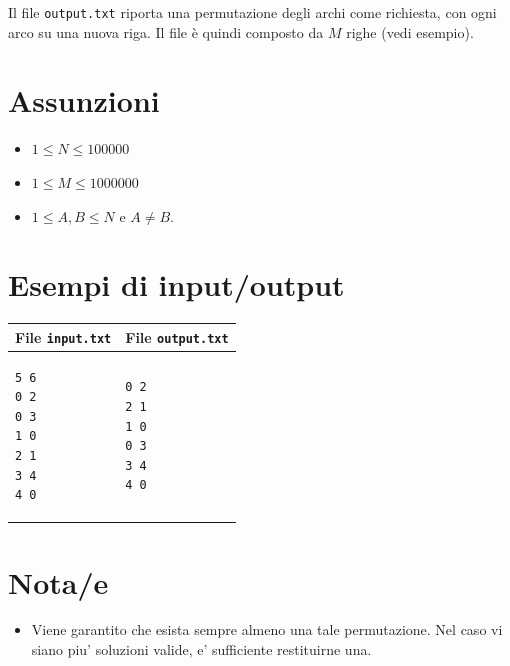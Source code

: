 \documentclass[a4paper,11pt]{article}
\begin{document}
Il file \texttt{output.txt}
riporta una permutazione degli archi come richiesta,
con ogni arco su una nuova riga.
Il file è quindi composto da $M$ righe (vedi esempio).

  \section*{Assunzioni}
  \begin{itemize}
  
    \item $1 ≤ N ≤ 100000$
    \item $1 ≤ M ≤ 1000000$
    \item $1 ≤ A, B ≤ N$ e $A ≠ B$.
  \end{itemize}

\section*{Esempi di input/output}

  
    \noindent
    \begin{tabular}{p{11cm}|p{5cm}}
    \toprule
    \textbf{File \texttt{input.txt}}
    & \textbf{File \texttt{output.txt}}
    \\
    \midrule
    \scriptsize
    \begin{verbatim}
5 6
0 2
0 3
1 0
2 1
3 4
4 0
\end{verbatim}
    &
    \scriptsize
    \begin{verbatim}
0 2
2 1
1 0
0 3
3 4
4 0
\end{verbatim}
    \\
    \bottomrule
    \end{tabular}
  
\section*{Nota/e}
\begin{itemize}
  
    \item 
Viene garantito che esista sempre almeno una tale permutazione. Nel caso vi siano piu' soluzioni valide, e' sufficiente restituirne una.


\end{itemize}
\end{document}
